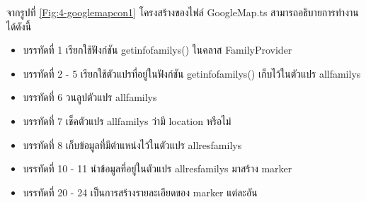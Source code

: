 จากรูปที่ \ref{Fig:4-googlemapcon1} โครงสร้างของไฟล์ GoogleMap.ts สามารถอธิบายการทำงานได้ดังนี้
\begin{itemize}[label={--}]
\item บรรทัดที่ 1 เรียกใช้ฟังก์ชัน getinfofamilys() ในคลาส FamilyProvider
\item บรรทัดที่ 2 - 5 เรียกใช้ตัวแปรที่อยู่ในฟังก์ชัน getinfofamilys() เก็บไว้ในตัวแปร allfamilys
\item บรรทัดที่ 6 วนลูปตัวแปร allfamilys
\item บรรทัดที่ 7 เช็คตัวแปร allfamilys ว่ามี location หรือไม่
\item บรรทัดที่ 8 เก็บข้อมูลที่มีตำแหน่งไว้ในตัวแปร allresfamilys
\item บรรทัดที่ 10 - 11 นำข้อมูลที่อยู่ในตัวแปร allresfamilys มาสร้าง marker
\item บรรทัดที่ 20 - 24 เป็นการสร้างรายละเอียดของ marker แต่ละอัน
\end{itemize}
\newpage


